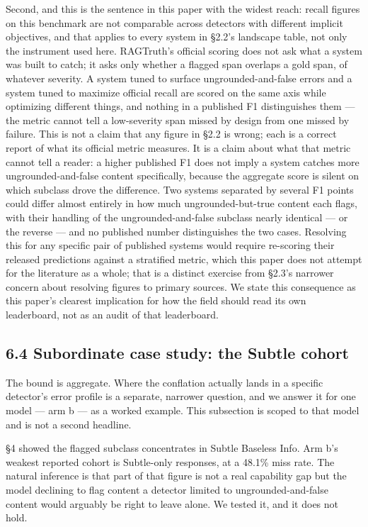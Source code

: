 \documentclass[11pt]{article}
\begin{document}
Second, and this is the sentence in this paper with the widest reach: recall figures on
this benchmark are not comparable across detectors with different implicit objectives, and
that applies to every system in §2.2's landscape table, not only the instrument used here.
RAGTruth's official scoring does not ask what a system was built to catch; it asks only
whether a flagged span overlaps a gold span, of whatever severity. A system tuned to
surface ungrounded-and-false errors and a system tuned to maximize official recall are
scored on the same axis while optimizing different things, and nothing in a published F1
distinguishes them --- the metric cannot tell a low-severity span missed by design from one
missed by failure. This is not a claim that any figure in §2.2 is wrong; each is a correct
report of what its official metric measures. It is a claim about what that metric cannot
tell a reader: a higher published F1 does not imply a system catches more
ungrounded-and-false content specifically, because the aggregate score is silent on which
subclass drove the difference. Two systems separated by several F1 points could differ
almost entirely in how much ungrounded-but-true content each flags, with their handling of
the ungrounded-and-false subclass nearly identical --- or the reverse --- and no published number
distinguishes the two cases. Resolving this for any specific pair of published systems
would require re-scoring their released predictions against a stratified metric, which
this paper does not attempt for the literature as a whole; that is a distinct exercise from
§2.3's narrower concern about resolving figures to primary sources. We state this
consequence as this paper's clearest implication for how the field should read its own
leaderboard, not as an audit of that leaderboard.

\subsection{6.4 Subordinate case study: the Subtle cohort}\label{subordinate-case-study-the-subtle-cohort}

The bound is aggregate. Where the conflation actually lands in a specific detector's error
profile is a separate, narrower question, and we answer it for one model --- arm b --- as a
worked example. This subsection is scoped to that model and is not a second headline.

§4 showed the flagged subclass concentrates in Subtle Baseless Info. Arm b's weakest
reported cohort is Subtle-only responses, at a 48.1\% miss rate. The natural inference is
that part of that figure is not a real capability gap but the model declining to flag
content a detector limited to ungrounded-and-false content would arguably be right to leave
alone. We tested it, and it does not hold.
\end{document}
